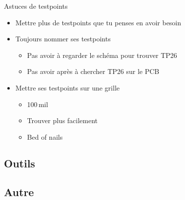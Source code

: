 \begin{frame}{Astuces de testpoints}
    \begin{twocolumns}
        \leftcol
        \begin{itemize}
            \item Mettre plus de testpoints que tu penses en avoir besoin
            \item Toujours nommer ses testpoints
            \begin{itemize}
                \item Pas avoir à regarder le schéma pour trouver TP26
                \item Pas avoir après à chercher TP26 sur le PCB
            \end{itemize}
            \item Mettre ses testpoints sur une grille
            \begin{itemize}
                \item 100\,mil
                \item Trouver plus facilement
                \item Bed of nails
            \end{itemize}
        \end{itemize}
        \rightcol
    \end{twocolumns}
\end{frame}


\subsection{Outils}

\subsection{Autre}

